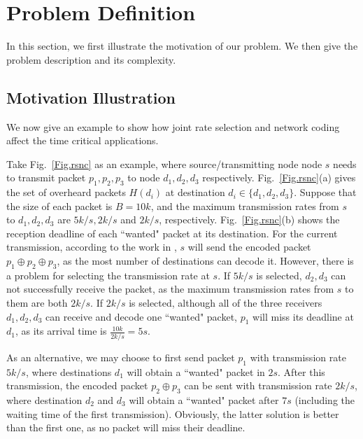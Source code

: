 \documentclass[journal]{IEEEtran}
\begin{document}
\section{Problem Definition}\label{Sec.formulation}
In this section, we first illustrate the motivation of our problem. We then give the problem description and its complexity.
\vspace{-0.24in}
\subsection{Motivation Illustration}\label{Sec.formulation.motivation}\vspace{-0.02in}
We now give an example to show how joint rate selection and network coding affect the time critical applications.

Take Fig.~\ref{Fig.rsnc} as an example, where source/transmitting node node $s$ needs to transmit packet $p_1,p_2,p_3$ to node $d_1,d_2,d_3$
respectively. Fig.~\ref{Fig.rsnc}(a) gives the set of overheard packets $H(d_i)$ at destination $d_i\in \{d_1,d_2,d_3\}$. Suppose that the size of each packet is $B=10k$, and the maximum transmission rates from $s$ to $d_1,d_2,d_3$ are $5k/s,2k/s$ and $2k/s$, respectively.
Fig.~\ref{Fig.rsnc}(b) shows the reception deadline of each ``wanted" packet at its destination. For the current transmission, according to the work in \cite{KRH+2008XORs510,ZX2010Broadcast6}, $s$ will send the encoded packet $p_1\oplus p_2\oplus p_3$, as the most number of destinations can decode it. However, there is a problem for selecting the transmission rate at $s$. If $5k/s$ is selected, $d_2,d_3$ can not successfully receive the packet, as the maximum transmission rates from $s$ to them are both $2k/s$. If $2k/s$ is selected, although all of the three receivers $d_1,d_2,d_3$ can receive and decode one ``wanted" packet, $p_1$  will miss its deadline at $d_1$, as its arrival time is $\frac{10k}{2k/s}=5s$.

As an alternative, we may choose to first send packet $p_1$ with transmission rate $5k/s$, where destinations $d_1$ will obtain a ``wanted" packet in $2s$. After this transmission, the encoded packet $p_2\oplus p_3$ can be sent with transmission rate $2k/s$, where destination $d_2$ and $d_3$ will obtain a ``wanted" packet after $7s$ (including the waiting time of the first transmission). Obviously, the latter solution is better than the first one, as no packet will miss their deadline.

\vspace{-0.15in}
\end{document}
